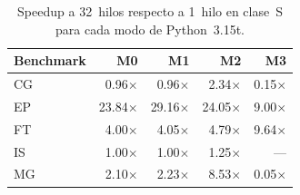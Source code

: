\begin{table}[htbp]
\centering
\small
\begin{tabular}{lrrrr}
\hline
Benchmark & M0 & M1 & M2 & M3 \\
\hline
CG & 0.96$\times$ & 0.96$\times$ & 2.34$\times$ & 0.15$\times$ \\
EP & 23.84$\times$ & 29.16$\times$ & 24.05$\times$ & 9.00$\times$ \\
FT & 4.00$\times$ & 4.05$\times$ & 4.79$\times$ & 9.64$\times$ \\
IS & 1.00$\times$ & 1.00$\times$ & 1.25$\times$ & --- \\
MG & 2.10$\times$ & 2.23$\times$ & 8.53$\times$ & 0.05$\times$ \\
\hline
\end{tabular}
\caption{Speedup a 32~hilos respecto a 1~hilo en clase~S para cada modo de Python~3.15t.}
\label{tab:resultados-s-speedup32-modos}
\end{table}

